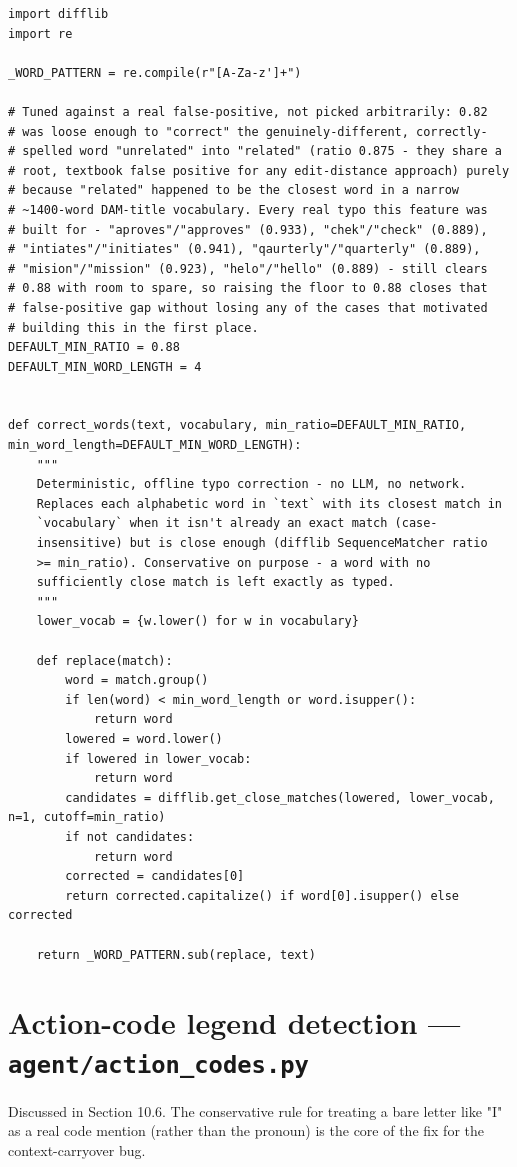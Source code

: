 \begin{lstlisting}[caption={knowledge/typo\_correct.py}]
import difflib
import re

_WORD_PATTERN = re.compile(r"[A-Za-z']+")

# Tuned against a real false-positive, not picked arbitrarily: 0.82
# was loose enough to "correct" the genuinely-different, correctly-
# spelled word "unrelated" into "related" (ratio 0.875 - they share a
# root, textbook false positive for any edit-distance approach) purely
# because "related" happened to be the closest word in a narrow
# ~1400-word DAM-title vocabulary. Every real typo this feature was
# built for - "aproves"/"approves" (0.933), "chek"/"check" (0.889),
# "intiates"/"initiates" (0.941), "qaurterly"/"quarterly" (0.889),
# "mision"/"mission" (0.923), "helo"/"hello" (0.889) - still clears
# 0.88 with room to spare, so raising the floor to 0.88 closes that
# false-positive gap without losing any of the cases that motivated
# building this in the first place.
DEFAULT_MIN_RATIO = 0.88
DEFAULT_MIN_WORD_LENGTH = 4


def correct_words(text, vocabulary, min_ratio=DEFAULT_MIN_RATIO, min_word_length=DEFAULT_MIN_WORD_LENGTH):
    """
    Deterministic, offline typo correction - no LLM, no network.
    Replaces each alphabetic word in `text` with its closest match in
    `vocabulary` when it isn't already an exact match (case-
    insensitive) but is close enough (difflib SequenceMatcher ratio
    >= min_ratio). Conservative on purpose - a word with no
    sufficiently close match is left exactly as typed.
    """
    lower_vocab = {w.lower() for w in vocabulary}

    def replace(match):
        word = match.group()
        if len(word) < min_word_length or word.isupper():
            return word
        lowered = word.lower()
        if lowered in lower_vocab:
            return word
        candidates = difflib.get_close_matches(lowered, lower_vocab, n=1, cutoff=min_ratio)
        if not candidates:
            return word
        corrected = candidates[0]
        return corrected.capitalize() if word[0].isupper() else corrected

    return _WORD_PATTERN.sub(replace, text)
\end{lstlisting}
\section{Action-code legend detection — \texttt{agent/\allowbreak{}action\_\allowbreak{}codes.py}}
Discussed in Section 10.6. The conservative rule for treating a bare letter like "I" as a real code mention (rather than the pronoun) is the core of the fix for the context-carryover bug.

